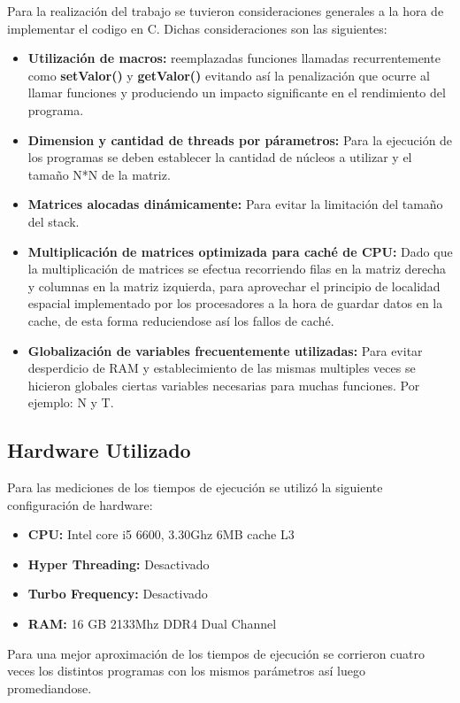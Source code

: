 Para la realización del trabajo se tuvieron consideraciones generales a la hora de implementar el codigo en C. Dichas consideraciones son las siguientes:

\begin{itemize}
\item \textbf{Utilización de macros:} reemplazadas funciones llamadas recurrentemente como \textbf{setValor()} y \textbf{getValor()} evitando así la penalización que ocurre al llamar funciones y produciendo un impacto significante en el rendimiento del programa.
\item \textbf{Dimension y cantidad de threads por párametros:} Para la ejecución de los programas se deben establecer la cantidad de núcleos a utilizar y el tamaño N*N de la matriz.
\item \textbf{Matrices alocadas dinámicamente:} Para evitar la limitación del tamaño del stack.
\item \textbf{Multiplicación de matrices optimizada para caché de CPU:} Dado que la multiplicación de matrices se efectua recorriendo filas en la matriz derecha y columnas en la matriz izquierda, para aprovechar el principio de localidad espacial implementado por los procesadores a la hora de guardar datos en la cache, de esta forma reduciendose así los fallos de caché.
\item \textbf{Globalización de variables frecuentemente utilizadas:} Para evitar desperdicio de RAM y establecimiento de las mismas multiples veces se hicieron globales ciertas variables necesarias para muchas funciones. Por ejemplo: N y T.
\end{itemize}

\subsection{Hardware Utilizado}

Para las mediciones de los tiempos de ejecución se utilizó la siguiente configuración de hardware:

\begin{itemize}
\item \textbf{CPU:} Intel core i5 6600, 3.30Ghz 6MB cache L3
\item \textbf{Hyper Threading:} Desactivado
\item \textbf{Turbo Frequency:} Desactivado
\item \textbf{RAM:} 16 GB 2133Mhz DDR4 Dual Channel
\end{itemize}

Para una mejor aproximación de los tiempos de ejecución se corrieron cuatro veces los distintos programas con los mismos parámetros así luego promediandose.